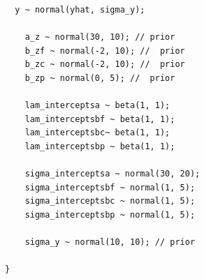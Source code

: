 \documentclass[11pt]{article}
\begin{document}
\begin{verbatim}
  y ~ normal(yhat, sigma_y);

    a_z ~ normal(30, 10); // prior
    b_zf ~ normal(-2, 10); //  prior 
    b_zc ~ normal(-2, 10); //  prior
    b_zp ~ normal(0, 5); //  prior

    lam_interceptsa ~ beta(1, 1);
    lam_interceptsbf ~ beta(1, 1);
    lam_interceptsbc~ beta(1, 1);
    lam_interceptsbp ~ beta(1, 1);

    sigma_interceptsa ~ normal(30, 20);
    sigma_interceptsbf ~ normal(1, 5);
    sigma_interceptsbc ~ normal(1, 5);
    sigma_interceptsbp ~ normal(1, 5);
    
    sigma_y ~ normal(10, 10); // prior
  
}


\end{verbatim}
\end{document}
